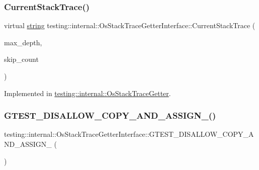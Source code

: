 \subsubsection{\texorpdfstring{Current\+Stack\+Trace()}{CurrentStackTrace()}}
{\footnotesize\ttfamily virtual \hyperlink{namespacetesting_1_1internal_a8e8ff5b11e64078831112677156cb111}{string} testing\+::internal\+::\+Os\+Stack\+Trace\+Getter\+Interface\+::\+Current\+Stack\+Trace (\begin{DoxyParamCaption}\item[{int}]{max\+\_\+depth,  }\item[{int}]{skip\+\_\+count }\end{DoxyParamCaption})\hspace{0.3cm}{\ttfamily [pure virtual]}}



Implemented in \hyperlink{classtesting_1_1internal_1_1OsStackTraceGetter_ad85d7766a222befa3e7f3c6932046ac2}{testing\+::internal\+::\+Os\+Stack\+Trace\+Getter}.

\mbox{\label{classtesting_1_1internal_1_1OsStackTraceGetterInterface_a7c3ad7c30af28080d7be852886ac3af0}} 
\subsubsection{\texorpdfstring{G\+T\+E\+S\+T\+\_\+\+D\+I\+S\+A\+L\+L\+O\+W\+\_\+\+C\+O\+P\+Y\+\_\+\+A\+N\+D\+\_\+\+A\+S\+S\+I\+G\+N\+\_\+()}{GTEST\_DISALLOW\_COPY\_AND\_ASSIGN\_()}}
{\footnotesize\ttfamily testing\+::internal\+::\+Os\+Stack\+Trace\+Getter\+Interface\+::\+G\+T\+E\+S\+T\+\_\+\+D\+I\+S\+A\+L\+L\+O\+W\+\_\+\+C\+O\+P\+Y\+\_\+\+A\+N\+D\+\_\+\+A\+S\+S\+I\+G\+N\+\_\+ (\begin{DoxyParamCaption}\item[{\hyperlink{classtesting_1_1internal_1_1OsStackTraceGetterInterface}{Os\+Stack\+Trace\+Getter\+Interface}}]{ }\end{DoxyParamCaption})\hspace{0.3cm}{\ttfamily [private]}}

